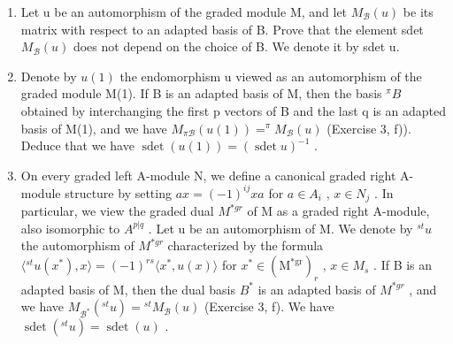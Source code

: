 \begin{enumerate}
\def\labelenumi{\alph{enumi})}
\item
  Let u be an automorphism of the graded module M, and let \(M_{\mathcal{B}}(u)\) be its matrix with respect to an adapted basis of B. Prove that the element sdet \(M_{\mathcal{B}}(u)\) does not depend on the choice of B. We denote it by sdet u.
\item
  Denote by \(u(1)\) the endomorphism u viewed as an automorphism of the graded module M(1). If B is an adapted basis of M, then the basis \(^{\pi}B\) obtained by interchanging the first p vectors of B and the last q is an adapted basis of M(1), and we have \(M_{\pi\mathcal{B}}(u(1)) = ^{\pi}M_{\mathcal{B}}(u)\) (Exercise 3, f)). Deduce that we have \(\operatorname{sdet}(u(1)) = (\operatorname{sdet} u)^{-1}\) .
\item
  On every graded left A-module N, we define a canonical graded right A-module structure by setting \(ax = (-1)^{ij}xa\) for \(a \in A_i\) , \(x \in N_j\) . In particular, we view the graded dual \(M^{*gr}\) of M as a graded right A-module, also isomorphic to \(A^{p|q}\) . Let u be an automorphism of M. We denote by \({}^{st}u\) the automorphism of \(M^{*gr}\) characterized by the formula \(\langle{}^{st}u(x^{*}), x\rangle = (-1)^{rs}\langle x^{*}, u(x)\rangle\) for \(x^{*} \in (\mathrm{M}^{*\mathrm{gr}})_r\) , \(x \in M_s\) . If B is an adapted basis of M, then the dual basis \(B^*\) is an adapted basis of \(M^{*gr}\) , and we have \(M_{\mathcal{B}^*}({}^{st}u) = {}^{st}M_{\mathcal{B}}(u)\) (Exercise 3, f). We have \(\operatorname{sdet}({}^{st}u) = \operatorname{sdet}(u)\) .
\end{enumerate}

